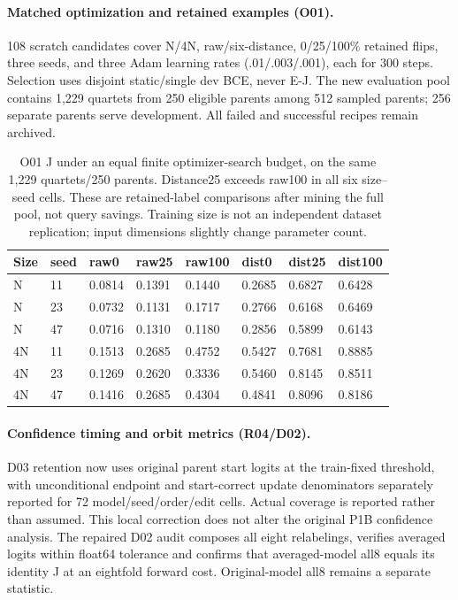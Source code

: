 \paragraph{Matched optimization and retained examples (O01).} 108 scratch candidates cover N/4N, raw/six-distance, 0/25/100\% retained flips, three seeds, and three Adam learning rates (.01/.003/.001), each for 300 steps. Selection uses disjoint static/single dev BCE, never E-J. The new evaluation pool contains 1,229 quartets from 250 eligible parents among 512 sampled parents; 256 separate parents serve development. All failed and successful recipes remain archived.
\begin{table}[t]\centering\small\begin{tabular}{@{}llllllll@{}}\toprule
Size & seed & raw0 & raw25 & raw100 & dist0 & dist25 & dist100 \\
\midrule
N & 11 & 0.0814 & 0.1391 & 0.1440 & 0.2685 & 0.6827 & 0.6428 \\
N & 23 & 0.0732 & 0.1131 & 0.1717 & 0.2766 & 0.6168 & 0.6469 \\
N & 47 & 0.0716 & 0.1310 & 0.1180 & 0.2856 & 0.5899 & 0.6143 \\
4N & 11 & 0.1513 & 0.2685 & 0.4752 & 0.5427 & 0.7681 & 0.8885 \\
4N & 23 & 0.1269 & 0.2620 & 0.3336 & 0.5460 & 0.8145 & 0.8511 \\
4N & 47 & 0.1416 & 0.2685 & 0.4304 & 0.4841 & 0.8096 & 0.8186 \\
\bottomrule\end{tabular}\caption{O01 J under an equal finite optimizer-search budget, on the same 1,229 quartets/250 parents. Distance25 exceeds raw100 in all six size--seed cells. These are retained-label comparisons after mining the full pool, not query savings. Training size is not an independent dataset replication; input dimensions slightly change parameter count.}\end{table}
\paragraph{Confidence timing and orbit metrics (R04/D02).} D03 retention now uses original parent start logits at the train-fixed threshold, with unconditional endpoint and start-correct update denominators separately reported for 72 model/seed/order/edit cells. Actual coverage is reported rather than assumed. This local correction does not alter the original P1B confidence analysis. The repaired D02 audit composes all eight relabelings, verifies averaged logits within float64 tolerance and confirms that averaged-model all8 equals its identity J at an eightfold forward cost. Original-model all8 remains a separate statistic.
